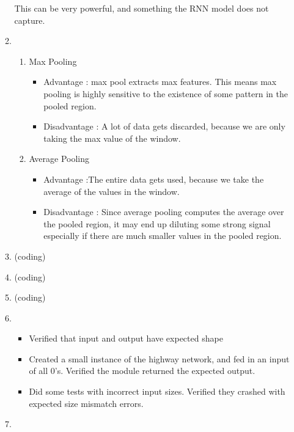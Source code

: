 \documentclass[]{article}
\begin{document}
\begin{enumerate}
\begin{enumerate}
		  This can be very powerful, and something the RNN model does not capture. 
		
		\item
			\begin{enumerate}
			\item Max Pooling
				\begin{itemize}
				\item Advantage : max pool extracts max features. This means max pooling is highly sensitive to the existence of some pattern in the pooled region.
				
				\item Disadvantage : A lot of data gets discarded, because we are only taking the max value of the window.
				\end{itemize}
			\item Average Pooling
				\begin{itemize}
				\item Advantage :The entire data gets used, because we take the average of the values in the window.
				\item Disadvantage : Since average pooling computes the average over the pooled region, it may end up diluting some strong signal especially if there are much smaller values in the pooled region.
				
				\end{itemize}
			\end{enumerate}
		\item
		(coding)
		
		\item
		(coding)
		
		\item
		(coding)
		
		\item
		
		\begin{itemize}
				\item Verified that input and output have expected shape
				\item Created a small instance of the highway network, and fed in an input of all 0's. Verified the module returned the expected output.
				\item Did some tests with incorrect input sizes. Verified they crashed with expected size mismatch errors.
		\end{itemize}
		
		\item
		

\end{enumerate}
\end{enumerate}
\end{document}
